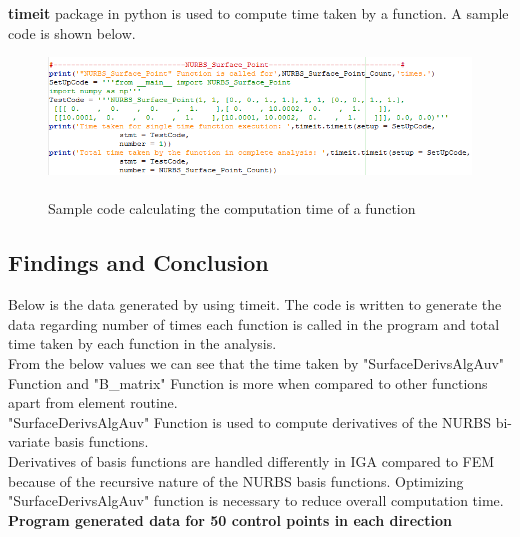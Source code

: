 \documentclass[11pt]{article}
\begin{document}
\textbf{timeit} package in python is used to compute time taken by a function. A sample code is shown below.
\begin{figure}[H]
	\begin{center}
		\includegraphics[scale=0.9]{TimeitCode.png} 
		\caption{\\Sample code calculating the computation time of a function}\label{TimeitCode}
	\end{center}	
\end{figure}
\subsection{Findings and Conclusion} \label{Findings}

Below is the data generated by using timeit. The code is written to generate the data regarding number of times each function is called in the program and total time taken by each function in the analysis.\\
From the below values we can see that the time taken by "SurfaceDerivsAlgAuv" Function and "B\_matrix" Function is more when compared to other functions apart from element routine. \\
"SurfaceDerivsAlgAuv" Function is used to compute derivatives of the NURBS bi-variate basis functions.\\ 
Derivatives of basis functions are handled differently in IGA compared to FEM because of the recursive nature of the NURBS basis functions. Optimizing "SurfaceDerivsAlgAuv" function is necessary to reduce overall computation time.\\
\textbf{Program generated data for 50 control points in each direction}
\end{document}
